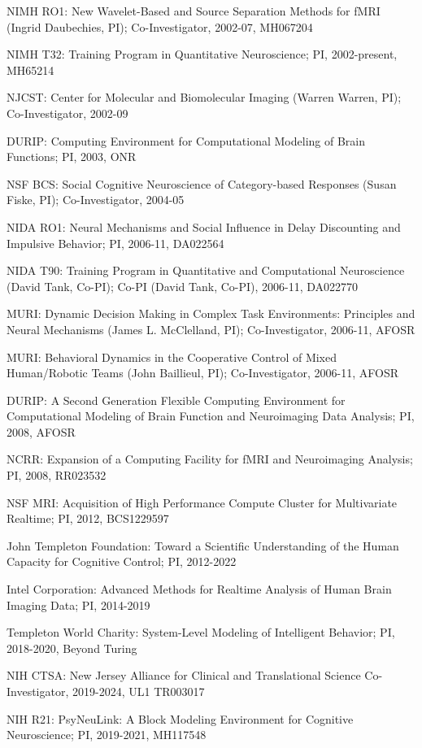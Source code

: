 \documentclass[10 pt]{article}
\begin{document}
NIMH RO1:
New Wavelet-Based and Source Separation Methods for fMRI (Ingrid Daubechies, PI);
Co-Investigator,
2002-07,
MH067204

NIMH T32:
Training Program in Quantitative Neuroscience;
PI,
2002-present,
MH65214

NJCST:
Center for Molecular and Biomolecular Imaging (Warren Warren, PI);
Co-Investigator,
2002-09

DURIP:
Computing Environment for Computational Modeling of Brain Functions;
PI,
2003,
ONR

NSF BCS:
Social Cognitive Neuroscience of Category-based Responses (Susan Fiske, PI);
Co-Investigator,
2004-05

NIDA RO1:
Neural Mechanisms and Social Influence in Delay Discounting and Impulsive Behavior;
PI,
2006-11,
DA022564

NIDA T90:
Training Program in Quantitative and Computational Neuroscience (David Tank, Co-PI);
Co-PI (David Tank, Co-PI),
2006-11,
DA022770

MURI:
Dynamic Decision Making in Complex Task Environments: Principles and Neural Mechanisms (James L. McClelland, PI);
Co-Investigator,
2006-11,
AFOSR

MURI:
Behavioral Dynamics in the Cooperative Control of Mixed Human/Robotic Teams (John Baillieul, PI);
Co-Investigator,
2006-11,
AFOSR

DURIP:
A Second Generation Flexible Computing Environment for Computational Modeling of Brain Function and Neuroimaging
Data Analysis;
PI,
2008,
AFOSR

NCRR:
Expansion of a Computing Facility for fMRI and Neuroimaging Analysis;
PI,
2008,
RR023532

NSF MRI:
Acquisition of High Performance Compute Cluster for Multivariate Realtime;
PI,
2012,
BCS1229597

John Templeton Foundation:
Toward a Scientific Understanding of the Human Capacity for Cognitive Control;
PI,
2012-2022

Intel Corporation:
Advanced Methods for Realtime Analysis of Human Brain Imaging Data;
PI,
2014-2019

Templeton World Charity:
System-Level Modeling of Intelligent Behavior;
PI,
2018-2020,
Beyond Turing

NIH CTSA:
New Jersey Alliance for Clinical and Translational Science
Co-Investigator,
2019-2024,
UL1 TR003017

NIH R21:
PsyNeuLink: A Block Modeling Environment for Cognitive Neuroscience;
PI,
2019-2021,
MH117548
\end{document}
